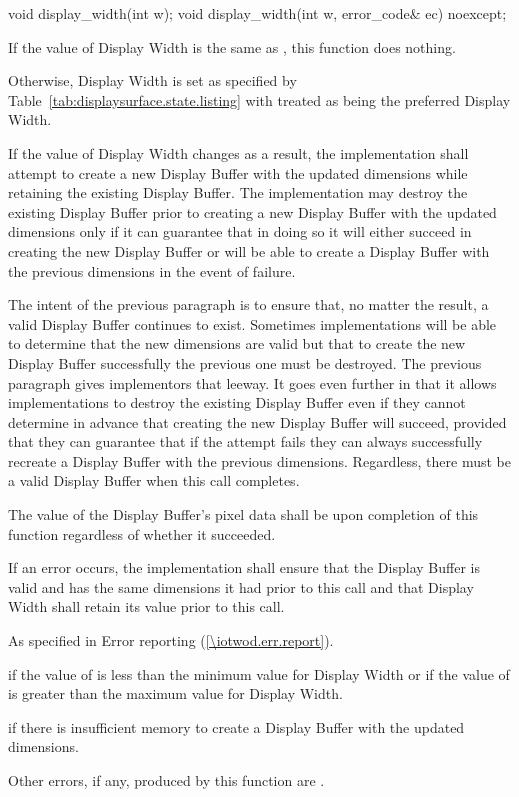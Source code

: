 \begin{itemdecl}
void display_width(int w);
void display_width(int w, error_code& ec) noexcept;
\end{itemdecl}
\begin{itemdescr}
\pnum
\effects
If the value of Display Width is the same as , this function does nothing.

\pnum
Otherwise, Display Width is set as specified by Table~\ref{tab:displaysurface.state.listing} with  treated as being the preferred Display Width.

\pnum
If the value of Display Width changes as a result, the implementation shall attempt to create a new Display Buffer with the updated dimensions while retaining the existing Display Buffer. The implementation may destroy the existing Display Buffer prior to creating a new Display Buffer with the updated dimensions only if it can guarantee that in doing so it will either succeed in creating the new Display Buffer or will be able to create a Display Buffer with the previous dimensions in the event of failure.

\pnum
\begin{note}
The intent of the previous paragraph is to ensure that, no matter the result, a valid Display Buffer continues to exist. Sometimes implementations will be able to determine that the new dimensions are valid but that to create the new Display Buffer successfully the previous one must be destroyed. The previous paragraph gives implementors that leeway. It goes even further in that it allows implementations to destroy the existing Display Buffer even if they cannot determine in advance that creating the new Display Buffer will succeed, provided that they can guarantee that if the attempt fails they can always successfully recreate a Display Buffer with the previous dimensions. Regardless, there must be a valid Display Buffer when this call completes.
\end{note}

\pnum
The value of the Display Buffer's pixel data shall be \unspecnorm upon completion of this function regardless of whether it succeeded.

\pnum
If an error occurs, the implementation shall ensure that the Display Buffer is valid and has the same dimensions it had prior to this call and that Display Width shall retain its value prior to this call.

\pnum
\throws
As specified in Error reporting (\ref{\iotwod.err.report}).

\pnum
\errors
{} if the value of  is less than the minimum value for Display Width or if the value of  is greater than the maximum value for Display Width.

 if there is insufficient memory to create a Display Buffer with the updated dimensions.

Other errors, if any, produced by this function are .
\end{itemdescr}

